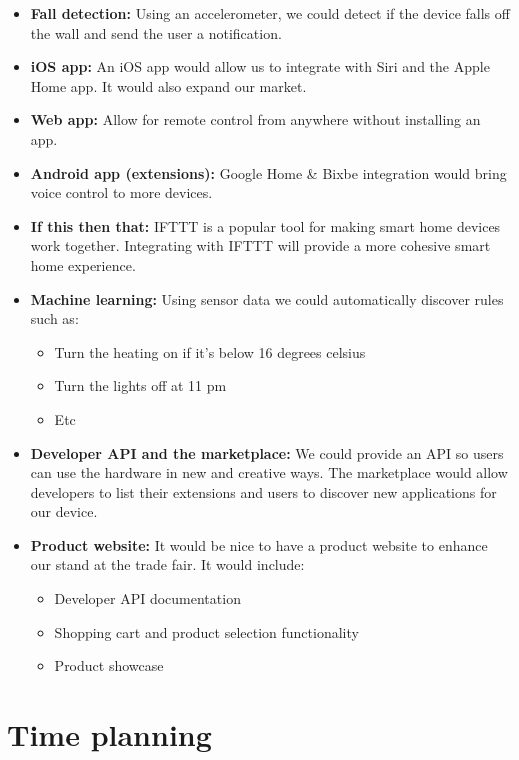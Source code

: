 \documentclass[onecolumn]{IEEEtran}
\begin{document}
\begin{itemize}
    \item \textbf{Fall detection:} Using an accelerometer, we could detect if the device falls off the wall and send the user a notification.
    \item \textbf{iOS app:} An iOS app would allow us to integrate with Siri and the Apple Home app. It would also expand our market.
    \item \textbf{Web app:} Allow for remote control from anywhere without installing an app.
    \item \textbf{Android app (extensions):} Google Home \& Bixbe integration would bring voice control to more devices.
    \item \textbf{If this then that:} IFTTT is a popular tool for making smart home devices work together. Integrating with IFTTT will provide a more cohesive smart home experience.
    \item \textbf{Machine learning:} Using sensor data we could automatically discover rules such as:
        \begin{itemize}
            \item Turn the heating on if it's below 16 degrees celsius
            \item Turn the lights off at 11 pm
            \item Etc
        \end{itemize}
    \item \textbf{Developer API and the marketplace:} We could provide an API so users can use the hardware in new and creative ways. The marketplace would allow developers to list their extensions and users to discover new applications for our device.
    \item \textbf{Product website:} It would be nice to have a product website to enhance our stand at the trade fair. It would include:
        \begin{itemize}
            \item Developer API documentation
            \item Shopping cart and product selection functionality
            \item Product showcase
        \end{itemize}
\end{itemize}

\section{Time planning}
\end{document}
